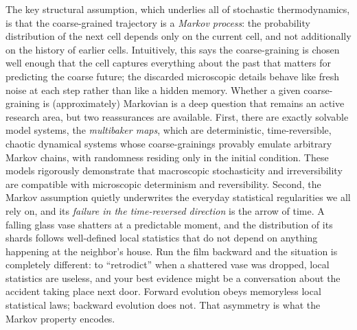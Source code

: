 \documentclass[10pt]{article}
\theoremstyle{definition}
\theoremstyle{remark}
\begin{document}
The key structural assumption, which underlies all of stochastic thermodynamics, is that the coarse-grained trajectory is a \emph{Markov process}: the probability distribution of the next cell depends only on the current cell, and not additionally on the history of earlier cells. Intuitively, this says the coarse-graining is chosen well enough that the cell captures everything about the past that matters for predicting the coarse future; the discarded microscopic details behave like fresh noise at each step rather than like a hidden memory. Whether a given coarse-graining is (approximately) Markovian is a deep question that remains an active research area, but two reassurances are available. First, there are exactly solvable model systems, the \emph{multibaker maps}, which are deterministic, time-reversible, chaotic dynamical systems whose coarse-grainings provably emulate arbitrary Markov chains, with randomness residing only in the initial condition. These models rigorously demonstrate that macroscopic stochasticity and irreversibility are compatible with microscopic determinism and reversibility. Second, the Markov assumption quietly underwrites the everyday statistical regularities we all rely on, and its \emph{failure in the time-reversed direction} is the arrow of time. A falling glass vase shatters at a predictable moment, and the distribution of its shards follows well-defined local statistics that do not depend on anything happening at the neighbor's house. Run the film backward and the situation is completely different: to ``retrodict'' when a shattered vase was dropped, local statistics are useless, and your best evidence might be a conversation about the accident taking place next door. Forward evolution obeys memoryless local statistical laws; backward evolution does not. That asymmetry is what the Markov property encodes.
\end{document}
